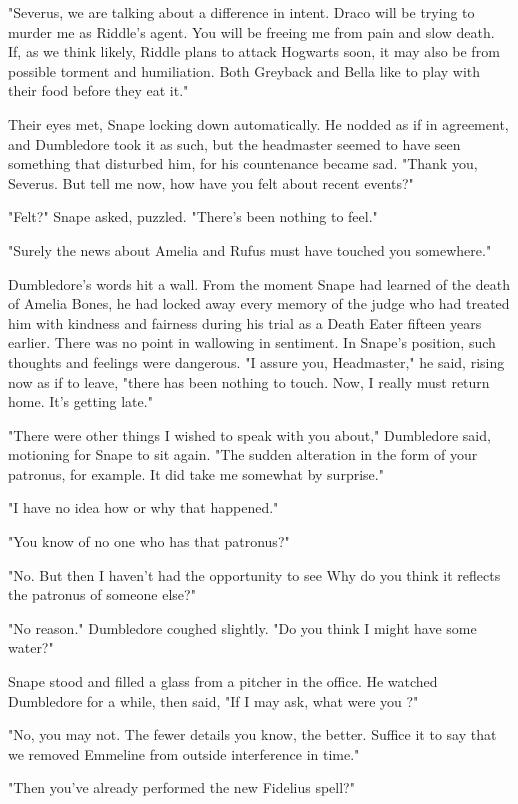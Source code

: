 "Severus, we are talking about a difference in intent. Draco will be trying to murder me as Riddle's agent. You will be freeing me from pain and slow death. If, as we think likely, Riddle plans to attack Hogwarts soon, it may also be from possible torment and humiliation. Both Greyback and Bella like to play with their food before they eat it."

Their eyes met, Snape locking down automatically. He nodded as if in agreement, and Dumbledore took it as such, but the headmaster seemed to have seen something that disturbed him, for his countenance became sad. "Thank you, Severus. But tell me now, how have you felt about recent events?"

"Felt?" Snape asked, puzzled. "There's been nothing to feel."

"Surely the news about Amelia and Rufus must have touched you somewhere."

Dumbledore's words hit a wall. From the moment Snape had learned of the death of Amelia Bones, he had locked away every memory of the judge who had treated him with kindness and fairness during his trial as a Death Eater fifteen years earlier. There was no point in wallowing in sentiment. In Snape's position, such thoughts and feelings were dangerous. "I assure you, Headmaster," he said, rising now as if to leave, "there has been nothing to touch. Now, I really must return home. It's getting late."

"There were other things I wished to speak with you about," Dumbledore said, motioning for Snape to sit again. "The sudden alteration in the form of your patronus, for example. It did take me somewhat by surprise."

"I have no idea how or why that happened."

"You know of no one who has that patronus?"

"No. But then I haven't had the opportunity to see{\el} Why do you think it reflects the patronus of someone else?"

"No reason." Dumbledore coughed slightly. "Do you think I might have some water?"

Snape stood and filled a glass from a pitcher in the office. He watched Dumbledore for a while, then said, "If I may ask, what were you{\el} ?"

"No, you may not. The fewer details you know, the better. Suffice it to say that we removed Emmeline from outside interference in time."

"Then you've already performed the new Fidelius spell?"

